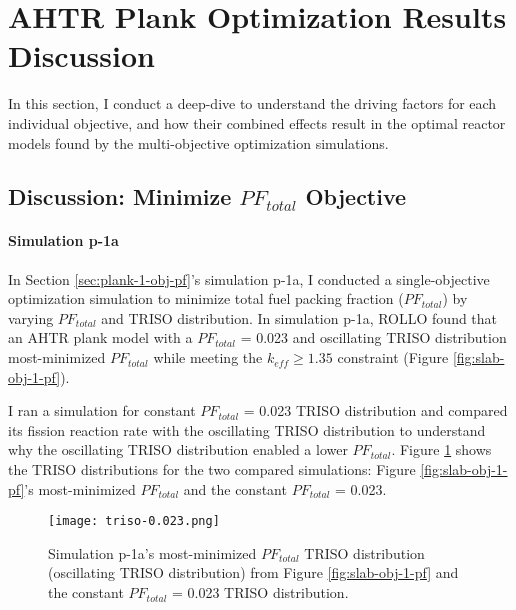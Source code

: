 \section{AHTR Plank Optimization Results Discussion}
\label{sec:plank-discussion}
In this section, I conduct a deep-dive to understand the driving factors for 
each individual objective, and how their combined effects result in the optimal 
reactor models found by the multi-objective optimization simulations. 

\subsection{Discussion: Minimize $PF_{total}$ Objective}
\label{sec:plank-discussion-pf}
\paragraph{Simulation p-1a}
In Section \ref{sec:plank-1-obj-pf}'s simulation p-1a, I conducted a single-objective 
optimization simulation to minimize total fuel packing fraction ($PF_{total}$) by 
varying $PF_{total}$ and TRISO distribution. 
In simulation p-1a, \gls{ROLLO} found that an \gls{AHTR} plank model with a
$PF_{total}$ = 0.023 and oscillating TRISO distribution most-minimized 
$PF_{total}$ while meeting the $k_{eff} \geq 1.35$ constraint 
(Figure \ref{fig:slab-obj-1-pf}). 

I ran a simulation for constant $PF_{total}$ = 0.023 TRISO distribution and compared its 
fission reaction rate with the oscillating TRISO distribution 
to understand why the oscillating TRISO distribution enabled a lower $PF_{total}$. 
Figure \ref{fig:triso-0.023} shows the TRISO distributions for the two compared 
simulations: Figure \ref{fig:slab-obj-1-pf}'s most-minimized $PF_{total}$ 
and the constant $PF_{total}$ = 0.023. 
\begin{figure}[htbp!]
    \centering
    \texttt{[image: triso-0.023.png]} 
    \caption{Simulation p-1a's most-minimized $PF_{total}$ TRISO distribution 
    (oscillating TRISO distribution) from Figure \ref{fig:slab-obj-1-pf} and the 
    constant $PF_{total}$ = 0.023 TRISO distribution.}
    \label{fig:triso-0.023}
\end{figure}


